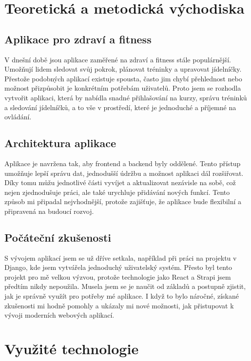 \documentclass[12pt, a4paper,
twoside,        %
openany
]{report}
\begin{document}
\chapter{Teoretická a metodická východiska}

\section{Aplikace pro zdraví a fitness}
\label{sec:uvod}

V dnešní době jsou aplikace zaměřené na zdraví a fitness stále populárnější. Umožňují lidem sledovat svůj pokrok, plánovat tréninky a upravovat jídelníčky. Přestože podobných aplikací existuje spousta, často jim chybí přehlednost nebo možnost přizpůsobit je konkrétním potřebám uživatelů. Proto jsem se rozhodla vytvořit aplikaci, která by nabídla snadné přihlašování na kurzy, správu tréninků a sledování jídelníčků, a to vše v prostředí, které je jednoduché a příjemné na ovládání.

\section{Architektura aplikace}
\label{sec:architektura_aplikace}
Aplikace je navržena tak, aby frontend a backend byly oddělené. Tento přístup umožňuje lepší správu dat, jednodušší údržbu a možnost aplikaci dál rozšiřovat. Díky tomu můžu jednotlivé části vyvíjet a aktualizovat nezávisle na sobě, což nejen zjednodušuje práci, ale také urychluje přidávání nových funkcí. Tento způsob mi připadal nejvhodnější, protože zajišťuje, že aplikace bude flexibilní a připravená na budoucí rozvoj.

\section{Počáteční zkušenosti}
\label{sec:pocatecni_zkusenosti}
S vývojem aplikací jsem se už dříve setkala, například při práci na projektu v Django, kde jsem vytvářela jednoduchý uživatelský systém. Přesto byl tento projekt pro mě velkou výzvou, protože technologie jako React a Strapi jsem předtím nikdy nepoužila. Musela jsem se je naučit od základů a postupně zjistit, jak je správně využít pro potřeby mé aplikace. I když to bylo náročné, získané zkušenosti mi hodně pomohly a ukázaly mi nové možnosti, jak přistupovat k vývoji moderních webových aplikací.

\chapter{Využité technologie}
\end{document}

